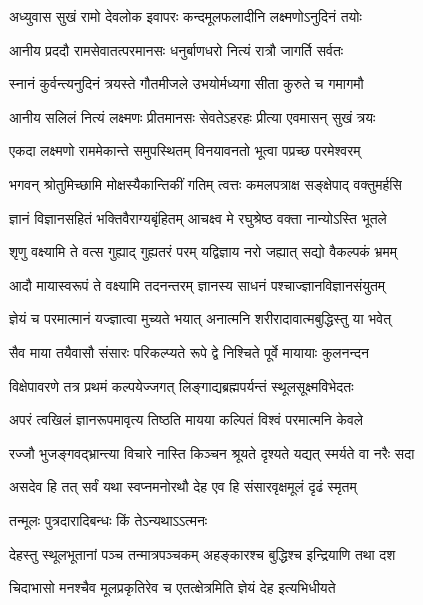\twolineshloka
{अध्युवास सुखं रामो देवलोक इवापरः}
{कन्दमूलफलादीनि लक्ष्मणोऽनुदिनं तयोः} %

\twolineshloka
{आनीय प्रददौ रामसेवातत्परमानसः}
{धनुर्बाणधरो नित्यं रात्रौ जागर्ति सर्वतः} %

\twolineshloka
{स्नानं कुर्वन्त्यनुदिनं त्रयस्ते गौतमीजले}
{उभयोर्मध्यगा सीता कुरुते च गमागमौ} %

\twolineshloka
{आनीय सलिलं नित्यं लक्ष्मणः प्रीतमानसः}
{सेवतेऽहरहः प्रीत्या एवमासन् सुखं त्रयः} %

\twolineshloka
{एकदा लक्ष्मणो राममेकान्ते समुपस्थितम्}
{विनयावनतो भूत्वा पप्रच्छ परमेश्वरम्} %

\twolineshloka
{भगवन् श्रोतुमिच्छामि मोक्षस्यैकान्तिकीं गतिम्}
{त्वत्तः कमलपत्राक्ष सङ्क्षेपाद् वक्तुमर्हसि} %

\twolineshloka
{ज्ञानं विज्ञानसहितं भक्तिवैराग्यबृंहितम्}
{आचक्ष्व मे रघुश्रेष्ठ वक्ता नान्योऽस्ति भूतले} %


\twolineshloka
{शृणु वक्ष्यामि ते वत्स गुह्याद् गुह्यतरं परम्}
{यद्विज्ञाय नरो जह्यात् सद्यो वैकल्पकं भ्रमम्} %

\twolineshloka
{आदौ मायास्वरूपं ते वक्ष्यामि तदनन्तरम्}
{ज्ञानस्य साधनं पश्चाज्ज्ञानविज्ञानसंयुतम्} %

\twolineshloka
{ज्ञेयं च परमात्मानं यज्ज्ञात्वा मुच्यते भयात्}
{अनात्मनि शरीरादावात्मबुद्धिस्तु या भवेत्} %

\twolineshloka
{सैव माया तयैवासौ संसारः परिकल्प्यते}
{रूपे द्वे निश्चिते पूर्वे मायायाः कुलनन्दन} %

\twolineshloka
{विक्षेपावरणे तत्र प्रथमं कल्पयेज्जगत्}
{लिङ्गाद्यब्रह्मपर्यन्तं स्थूलसूक्ष्मविभेदतः} %

\twolineshloka
{अपरं त्वखिलं ज्ञानरूपमावृत्य तिष्ठति}
{मायया कल्पितं विश्वं परमात्मनि केवले} %

\twolineshloka
{रज्जौ भुजङ्गवद्भ्रान्त्या विचारे नास्ति किञ्चन}
{श्रूयते दृश्यते यद्यत् स्मर्यते वा नरैः सदा} %

\twolineshloka
{असदेव हि तत् सर्वं यथा स्वप्नमनोरथौ}
{देह एव हि संसारवृक्षमूलं दृढं स्मृतम्} %

\onelineshloka
{तन्मूलः पुत्रदारादिबन्धः किं तेऽन्यथाऽऽत्मनः} %


\twolineshloka
{देहस्तु स्थूलभूतानां पञ्च तन्मात्रपञ्चकम्}
{अहङ्कारश्च बुद्धिश्च इन्द्रियाणि तथा दश} %

\twolineshloka
{चिदाभासो मनश्चैव मूलप्रकृतिरेव च}
{एतत्क्षेत्रमिति ज्ञेयं देह इत्यभिधीयते} %

